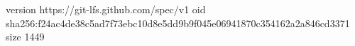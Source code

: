 version https://git-lfs.github.com/spec/v1
oid sha256:f24ac4de38c5ad7f73ebc10d8e5dd9b9f045e06941870c354162a2a846cd3371
size 1449
